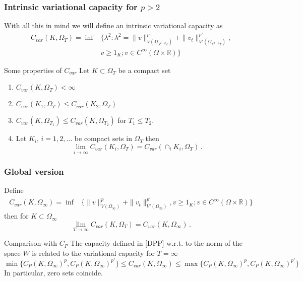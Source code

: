 \documentclass[10pt]{beamer}
\newcommand{\R}{\mathbb{R}}
\begin{document}
\begin{frame}
	\frametitle{Intrinsic variational capacity for $p > 2$}
	With all this in mind we will define an intrinsic variational capacity as
	\begin{align*} \nonumber \label{}
		C_{var}(K,\Omega_T) = \inf &\{\lambda^2: \lambda^2 = \|v\|^{p}_{V(\Omega_{\lambda^{2-p}T})} + \|v_t\|^{p'}_{V'(\Omega_{\lambda^{2-p}T})}, \\
		&v \geq 1_K; v \in C^\infty(\Omega \times \R) \}
	\end{align*}
	\pause
	\begin{block}{Some properties of $C_{var}$}
		Let $K \subset \Omega_T$ be a compact set
		\begin{enumerate}
			\item \label{p1} $C_{var}(K,\Omega_T) < \infty$
			\item \label{p2} $C_{var}(K_1,\Omega_T) \leq C_{var}(K_2,\Omega_T)$
			\item \label{p3} $C_{var}(K,\Omega_{T_1}) \leq C_{var}(K,\Omega_{T_2})$ for $T_1 \leq T_2$.
			\item \label{p4} Let $K_i$, $i=1,2,\ldots$ be compact sets in $\Omega_T$ then
			\begin{equation} \nonumber \label{}
				\lim_{i \to \infty} C_{var}(K_i,\Omega_T) = C_{var}(\cap_i K_i,\Omega_T)\,.
			\end{equation}
		\end{enumerate}
	\end{block}
\end{frame}

\begin{frame}
	\frametitle{Global version}
	\begin{lemma}
		Define
		\begin{align*} \nonumber \label{}
			C_{var}(K,\Omega_\infty) = \inf &\{\|v\|^{p}_{V(\Omega_{\infty})} + \|v_t\|^{p'}_{V'(\Omega_{\infty})}, v \geq 1_K; v \in C^\infty(\Omega \times \R) \}
		\end{align*}
		then for $K \subset \Omega_\infty$
		\begin{equation} \nonumber \label{}
			\lim_{T \to \infty} C_{var}(K,\Omega_T) = C_{var}(K,\Omega_\infty)\,.
		\end{equation}
	\end{lemma}
	\pause
	\begin{block}{Comparison with $C_P$}
		The capacity defined in [DPP] w.r.t. to the norm of the space $W$ is related to the variational capacity for $T = \infty$
		{\small
		\begin{equation} \nonumber \label{}
			\min\{C_{P}(K,\Omega_\infty)^p,C_{P}(K,\Omega_\infty)^{p'}\} \leq C_{var}(K,\Omega_\infty) \leq \max\{C_{P}(K,\Omega_\infty)^p,C_{P}(K,\Omega_\infty)^{p'}\}
		\end{equation}}
		In particular, zero sets coincide.
	\end{block}
\end{frame}
\end{document}
